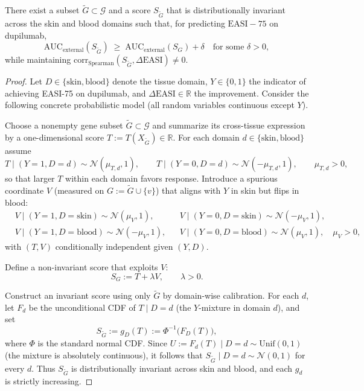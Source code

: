 ﻿\begin{theorem}\label{thm:invariant-score-auc-gain}
There exist a subset \(\tilde G\subset\mathcal{G}\) and a score \(S_{\tilde G}\) that is distributionally invariant across the skin and blood domains such that, for predicting \(\mathrm{EASI}{-}75\) on dupilumab,
\[
\mathrm{AUC}_{\text{external}}(S_{\tilde G})\;\ge\;\mathrm{AUC}_{\text{external}}(S_G)+\delta\quad\text{for some }\delta>0,
\]
while maintaining \(\mathrm{corr}_{\text{Spearman}}(S_{\tilde G},\Delta\mathrm{EASI})\neq 0\).
\end{theorem}

\begin{proof}
Let \(D\in\{\text{skin},\text{blood}\}\) denote the tissue domain, \(Y\in\{0,1\}\) the indicator of achieving EASI-75 on dupilumab, and \(\Delta\mathrm{EASI}\in\mathbb{R}\) the improvement. Consider the following concrete probabilistic model (all random variables continuous except \(Y\)).

Choose a nonempty gene subset \(\tilde G\subset\mathcal G\) and summarize its cross-tissue expression by a one-dimensional score \(T:=T(X_{\tilde G})\in\mathbb{R}\). For each domain \(d\in\{\text{skin},\text{blood}\}\) assume
\[
T\mid(Y{=}1,D{=}d)\sim\mathcal N(\mu_{T,d},1),\qquad 
T\mid(Y{=}0,D{=}d)\sim\mathcal N(-\mu_{T,d},1),\qquad \mu_{T,d}>0,
\]
so that larger \(T\) within each domain favors response. Introduce a spurious coordinate \(V\) (measured on \(G:=\tilde G\cup\{v\}\)) that aligns with \(Y\) in skin but flips in blood:
\[
\begin{aligned}
&V\mid(Y{=}1,D{=}\text{skin})\sim\mathcal N(\mu_V,1),&& V\mid(Y{=}0,D{=}\text{skin})\sim\mathcal N(-\mu_V,1),\\
&V\mid(Y{=}1,D{=}\text{blood})\sim\mathcal N(-\mu_V,1),&& V\mid(Y{=}0,D{=}\text{blood})\sim\mathcal N(\mu_V,1),\quad \mu_V>0,
\end{aligned}
\]
with \((T,V)\) conditionally independent given \((Y,D)\).

Define a non-invariant score that exploits \(V\):
\[
S_G:=T+\lambda V,\qquad \lambda>0.
\]

Construct an invariant score using only \(\tilde G\) by domain-wise calibration. For each \(d\), let \(F_d\) be the unconditional CDF of \(T\mid D{=}d\) (the \(Y\)-mixture in domain \(d\)), and set
\[
S_{\tilde G}:=g_D(T):=\Phi^{-1}\big(F_D(T)\big),
\]
where \(\Phi\) is the standard normal CDF. Since \(U:=F_d(T)\mid D{=}d\sim\mathrm{Unif}(0,1)\) (the mixture is absolutely continuous), it follows that \(S_{\tilde G}\mid D{=}d\sim\mathcal N(0,1)\) for every \(d\). Thus \(S_{\tilde G}\) is distributionally invariant across skin and blood, and each \(g_d\) is strictly increasing.


\end{proof}

